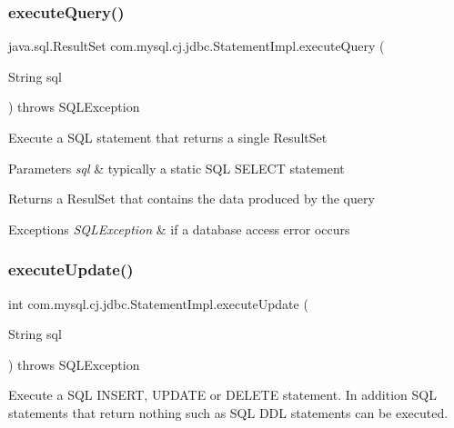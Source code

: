 \subsubsection{\texorpdfstring{execute\+Query()}{executeQuery()}}
{\footnotesize\ttfamily java.\+sql.\+Result\+Set com.\+mysql.\+cj.\+jdbc.\+Statement\+Impl.\+execute\+Query (\begin{DoxyParamCaption}\item[{String}]{sql }\end{DoxyParamCaption}) throws S\+Q\+L\+Exception}

Execute a S\+QL statement that returns a single Result\+Set


\begin{DoxyParams}{Parameters}
{\em sql} & typically a static S\+QL S\+E\+L\+E\+CT statement\\
\hline
\end{DoxyParams}
\begin{DoxyReturn}{Returns}
a Resul\+Set that contains the data produced by the query
\end{DoxyReturn}

\begin{DoxyExceptions}{Exceptions}
{\em S\+Q\+L\+Exception} & if a database access error occurs \\
\hline
\end{DoxyExceptions}
\mbox{\label{classcom_1_1mysql_1_1cj_1_1jdbc_1_1_statement_impl_a8df7dbcd016833437419cfdbae14b187}} 
\subsubsection{\texorpdfstring{execute\+Update()}{executeUpdate()}\hspace{0.1cm}{\footnotesize\ttfamily [1/4]}}
{\footnotesize\ttfamily int com.\+mysql.\+cj.\+jdbc.\+Statement\+Impl.\+execute\+Update (\begin{DoxyParamCaption}\item[{String}]{sql }\end{DoxyParamCaption}) throws S\+Q\+L\+Exception}

Execute a S\+QL I\+N\+S\+E\+RT, U\+P\+D\+A\+TE or D\+E\+L\+E\+TE statement. In addition S\+QL statements that return nothing such as S\+QL D\+DL statements can be executed.


